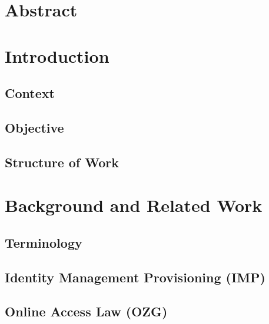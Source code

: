 \documentclass[
     12pt,         %
     a4paper,      %
     BCOR=10mm,version=first,     %
     DIV=14,version=first,        %
     ]{scrreprt}
\begin{document}
\newpage

\chapter*{Abstract}

\newpage

\tableofcontents
\cleardoublepage
{}

\chapter{Introduction}

\section{Context}



\section{Objective}



\section{Structure of Work}



\chapter{Background and Related Work}

\section{Terminology}



\section{Identity Management Provisioning (IMP)}



\section{Online Access Law (OZG)}
\end{document}
